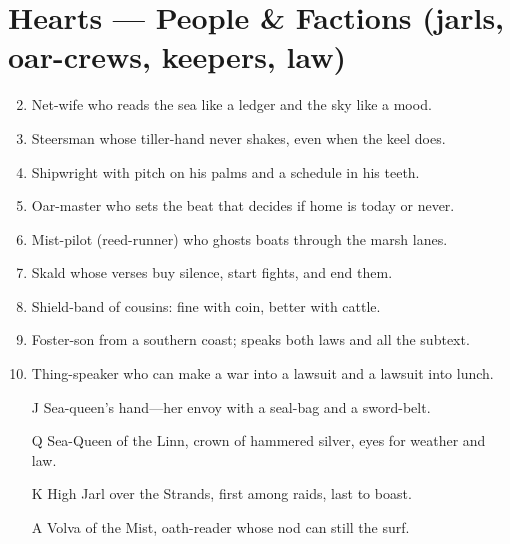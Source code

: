 \section*{Hearts --- People \& Factions (jarls, oar-crews, keepers, law)}
\label{sec:linn-people}
\begin{enumerate}
\setcounter{enumi}{1}
\item Net-wife who reads the sea like a ledger and the sky like a mood.
\item Steersman whose tiller-hand never shakes, even when the keel does.
\item Shipwright with pitch on his palms and a schedule in his teeth.
\item Oar-master who sets the beat that decides if home is today or never.
\item Mist-pilot (reed-runner) who ghosts boats through the marsh lanes.
\item Skald whose verses buy silence, start fights, and end them.
\item Shield-band of cousins: fine with coin, better with cattle.
\item Foster-son from a southern coast; speaks both laws and all the subtext.
\item Thing-speaker who can make a war into a lawsuit and a lawsuit into lunch.
\item[J] Sea-queen's hand---her envoy with a seal-bag and a sword-belt.
\item[Q] Sea-Queen of the Linn, crown of hammered silver, eyes for weather and law.
\item[K] High Jarl over the Strands, first among raids, last to boast.
\item[A] Volva of the Mist, oath-reader whose nod can still the surf.
\end{enumerate}

